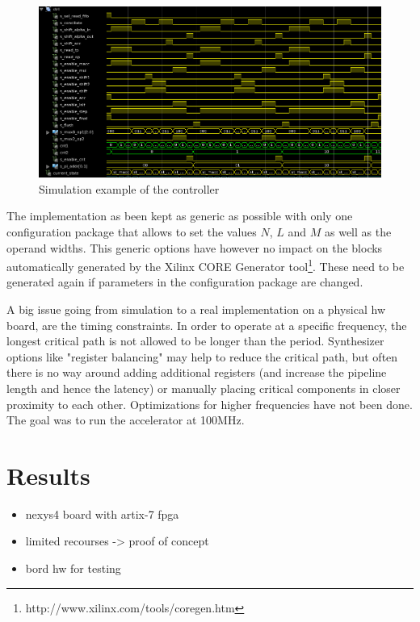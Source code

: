 \documentclass[mscthesis]{usiinfthesis}
\begin{document}
\begin{figure}
    \includegraphics[width=1\columnwidth]{./schema/test_ctrl.png}
    \caption{Simulation example of the controller}
    \label{fig:test_ctrl}
\end{figure}

The implementation as been kept as generic as possible with only
one configuration package that allows to set the values $N$, $L$ and $M$ as well
as the operand widths. This generic options have however no impact on the
blocks automatically generated by the Xilinx CORE Generator
tool\footnote{http://www.xilinx.com/tools/coregen.htm}. These need to be
generated again if parameters in the configuration package are changed.

A big issue going from simulation to a real implementation on a physical
\gls{hw} board, are the timing constraints. In order to operate at a specific
frequency, the longest critical path is not allowed to be longer than the
period.  Synthesizer options like "register balancing" may help to reduce the
critical path, but often there is no way around adding additional registers
(and increase the pipeline length and hence the latency) or manually placing
critical components in closer proximity to each other. Optimizations for higher
frequencies have not been done. The goal was to run the accelerator at 100MHz.

\chapter{Results}
\label{ch:results}
\glsresetall %

\begin{itemize}
    \item nexys4 board with artix-7 fpga
    \item limited recourses -> proof of concept
    \item bord \gls{hw} for testing
\end{itemize}
\end{document}
